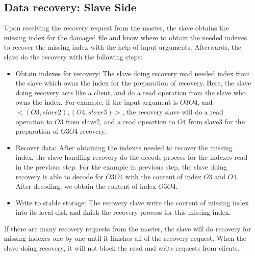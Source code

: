 \documentclass[conference]{IEEEtran}
\begin{document}
\subsection{Data recovery: Slave Side}
Upon receiving the recovery request from the master, the slave obtains the missing index for the damaged file and know where to obtain the needed indexes to recover the missing index with the help of input arguments. Afterwards, the slave do the recovery with the following steps:
\begin{itemize}
\item Obtain indexes for recovery: The  slave doing recovery read needed index from the slave which owns the index for the preparation of recovery. Here, the  slave doing recovery acts like a client, and do a read operation from the slave who owns the index. For example, if the input argument is $O3O4$, and $<(O3,slave2),(O4,slave3)>$, the recovery slave will do a read operation to $O3$ from slave2, and a read opeartion to $O4$ from slave3 for the preparation of  $O3O4$ recovery.
\item Recover data: After obtaining the indexes needed to recover the missing index, the slave handling recovery do the decode process for the indexes read in the previous step. For the example in previous step, the  slave doing recovery is able to  decode for $O3O4$ with the content of index $O3$ and $O4$. After decoding, we obtain the content of index $O3O4$.
\item Write to stable storage: The recovery slave write the content of missing index into its local disk and finish the recovery process for this missing index.
\end{itemize}
If there are many recovery requests from the master, the slave will do recovery for missing indexes one by one until it finishes all of the recovery request. When the slave doing recovery, it will not block the read and write requests from clients.
\end{document}
